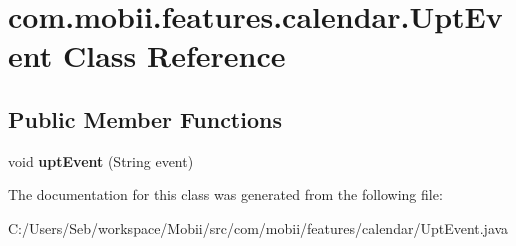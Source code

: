 \hypertarget{classcom_1_1mobii_1_1features_1_1calendar_1_1_upt_event}{\section{com.\-mobii.\-features.\-calendar.\-Upt\-Event Class Reference}
\label{classcom_1_1mobii_1_1features_1_1calendar_1_1_upt_event}
}
\subsection*{Public Member Functions}
\begin{DoxyCompactItemize}
\item 
\hypertarget{classcom_1_1mobii_1_1features_1_1calendar_1_1_upt_event_adad1567d1202b165f9f78db2ca80fcc0}{void {\bfseries upt\-Event} (String event)}\label{classcom_1_1mobii_1_1features_1_1calendar_1_1_upt_event_adad1567d1202b165f9f78db2ca80fcc0}

\end{DoxyCompactItemize}


The documentation for this class was generated from the following file\-:\begin{DoxyCompactItemize}
\item 
C\-:/\-Users/\-Seb/workspace/\-Mobii/src/com/mobii/features/calendar/Upt\-Event.\-java\end{DoxyCompactItemize}
